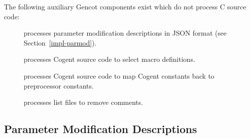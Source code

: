 The following auxiliary Gencot components exist which do not process C source code:
\begin{description}
\item[] processes parameter modification descriptions in JSON format (see Section~\ref{impl-parmod}).
\item[] processes Cogent source code to select macro definitions.
\item[] processes Cogent source code to map Cogent constants back to preprocessor constants.
\item[] processes list files to remove comments.
\end{description}

\subsection{Parameter Modification Descriptions}
\label{impl-ocomps-parmod}

